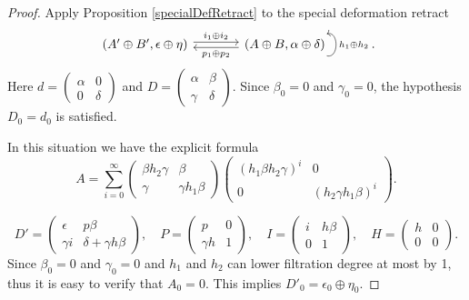 \documentclass{article}
\newcommand{\sdr}[5]{%
  \begin{tikzcd}[column sep=large, ampersand replacement=\&]
    {#1} \arrow[r, "#3", shift left=0.5ex,] \arrow[r, leftarrow, "#4", shift right=0.5ex, swap] \& 
    {#2} \arrow[loop right, distance=1em, in=15, out=-15, "#5",swap]
  \end{tikzcd}%
}
\theoremstyle{plain} %
\theoremstyle{definition} %
\theoremstyle{remark} %
\begin{document}
\begin{proof}
Apply Proposition \ref{specialDefRetract} to the special deformation retract 
$$\sdr{(A'\oplus B',\epsilon\oplus \eta)}{(A\oplus B,\alpha\oplus \delta)}{i_1\oplus i_2}{p_1\oplus p_2}{h_1\oplus h_2}.$$
Here $d=\begin{pmatrix}\alpha & 0\\ 0 & \delta \end{pmatrix}$ and $D=\begin{pmatrix}\alpha & \beta \\ \gamma & \delta \end{pmatrix}$. Since $\beta_0=0$ and $\gamma_0=0$, the hypothesis $D_0=d_0$ is satisfied. 

    In this situation we have the explicit formula
    $$A= \sum_{i=0}^\infty\begin{pmatrix}
    \beta h_2\gamma& \beta \\ \gamma & \gamma h_1 \beta
\end{pmatrix}\begin{pmatrix}
   (h_1\beta h_2\gamma)^i & 0\\ 0& (h_2\gamma h_1\beta )^i
\end{pmatrix}.$$

 $$D'=
 \begin{pmatrix}
     \epsilon & p\beta \\
     \gamma i & \delta + \gamma h\beta
 \end{pmatrix}, 
 \quad P= 
 \begin{pmatrix}
     p &  0
     \\
     \gamma h & 1 
 \end{pmatrix},
 \quad I= 
 \begin{pmatrix}
     i & h\beta \\
     0& 1 
 \end{pmatrix},
 \quad H= 
 \begin{pmatrix}
     h & 0\\
     0& 0
 \end{pmatrix}.$$
Since $\beta_0=0$ and $\gamma_0=0$ and $h_1$ and $h_2$ can lower filtration degree at most by 1, thus it is easy to verify that $A_0=0$. This implies $D'_0=\epsilon_0\oplus \eta_0$.
\end{proof}
\end{document}
